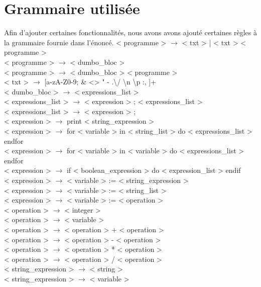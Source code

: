 \documentclass[a4paper,10pt]{article}
\begin{document}
\section{Grammaire utilisée}
Afin d'ajouter certaines fonctionnalités, nous avons avons ajouté certaines règles à la grammaire fournie dans l'énoncé.\newline
{\small
< programme > $\rightarrow$ < txt > | < txt > < programme >\\
< programme > $\rightarrow$ < dumbo\_bloc > \\
< programme > $\rightarrow$ < dumbo\_bloc > < programme > \\
< txt > $\rightarrow$ [a-zA-Z0-9; \& <> " - .\textbackslash / \textbackslash n \textbackslash p :, ]+ \\
< dumbo\_bloc > $\rightarrow$ {{ < expressions\_list > }} \\
< expressions\_list > $\rightarrow$ < expression > ; < expressions\_list >\\
< expressions\_list > $\rightarrow$ < expression > ; \\
< expression > $\rightarrow$ print < string\_expression > \\
< expression > $\rightarrow$ for < variable > in < string\_list > do < expressions\_list > endfor \\
< expression > $\rightarrow$ for < variable > in < variable > do < expressions\_list > endfor \\
< expression > $\rightarrow$ if < boolean\_expression > do < expression\_list > endif\\
< expression > $\rightarrow$ < variable > := < string\_expression > \\
< expression > $\rightarrow$ < variable > := < string\_list > \\
< expression > $\rightarrow$ < variable > := < operation > \\
< operation > $\rightarrow$ < integer > \\
< operation > $\rightarrow$ < variable > \\
< operation > $\rightarrow$ < operation > + < operation >\\
< operation > $\rightarrow$ < operation > - < operation >\\
< operation > $\rightarrow$ < operation > * < operation >\\
< operation > $\rightarrow$ < operation > / < operation >\\
< string\_expression > $\rightarrow$ < string > \\
< string\_expression > $\rightarrow$ < variable > \\
}
\end{document}
